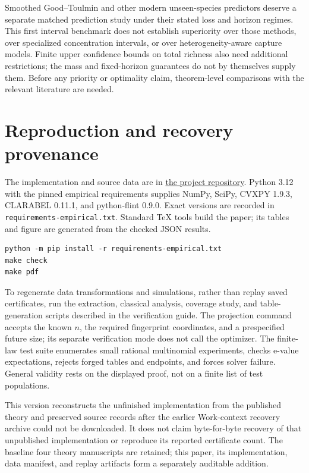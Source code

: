 \documentclass[11pt]{article}
\theoremstyle{remark}\newtheorem{remark}[theorem]{Remark}
\begin{document}
Smoothed Good--Toulmin and other modern unseen-species predictors deserve a
separate matched prediction study under their stated loss and horizon regimes.
This first interval benchmark does not establish superiority over those
methods, over specialized concentration intervals, or over heterogeneity-aware
capture models. Finite upper confidence bounds on total richness also need
additional restrictions; the mass and fixed-horizon guarantees do not by
themselves supply them. Before any priority or optimality claim, theorem-level
comparisons with the relevant literature are needed.

\section{Reproduction and recovery provenance}
The implementation and source data are in
\href{https://github.com/long-mathematics/partial-population-inference}{the project repository}.
Python 3.12 with the pinned empirical requirements supplies NumPy, SciPy,
CVXPY 1.9.3, CLARABEL 0.11.1, and python-flint 0.9.0. Exact versions are
recorded in \texttt{requirements-empirical.txt}. Standard TeX tools build the
paper; its tables and figure are generated from the checked JSON results.

\begin{samepage}\begin{verbatim}
python -m pip install -r requirements-empirical.txt
make check
make pdf
\end{verbatim}\end{samepage}
To regenerate data transformations and simulations, rather than replay saved
certificates, run the extraction, classical analysis, coverage study, and
table-generation scripts described in the verification guide. The projection
command accepts the known $n$, the required fingerprint coordinates, and a
prespecified future size; its separate verification mode does not call the
optimizer. The finite-law test suite enumerates small rational multinomial
experiments, checks e-value expectations, rejects forged tables and endpoints,
and forces solver failure. General validity rests on the displayed proof,
not on a finite list of test populations.

This version reconstructs the unfinished implementation from the published
theory and preserved source records after the earlier Work-context recovery
archive could not be downloaded. It does not claim byte-for-byte recovery of
that unpublished implementation or reproduce its reported certificate count.
The baseline four theory manuscripts are retained; this paper, its implementation,
data manifest, and replay artifacts form a separately auditable addition.
\end{document}
